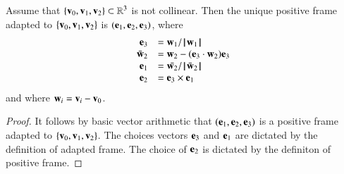 \begin{lemma}[orthonormalization]
\label{lemma:frame}
  Assume that $\{\v_0,\v_1,\v_2\}\subset\ring{R}^3$ is not collinear.
  Then the unique positive frame adapted to 
  $\{\v_0,\v_1,\v_2\}$ is $(\e_1,\e_2,\e_3)$, where
\begin{displaymath}
\begin{array}{rll}
\e_3 &= \w_1/\normo{\w_1}\\
\bar{\w}_2 &= \w_2 - (\e_3\cdot \w_2) \e_3\\
\e_1 &= \bar{\w_2}/\normo{\bar{\w}_2}\\
\e_2 &= \e_3 \times \e_1 \\
\end{array}
\end{displaymath}
and where $\w_i = \v_i - \v_0$.
\end{lemma}

\begin{proof} It follows by basic vector arithmetic that
  $(\e_1,\e_2,\e_3)$ is a positive frame adapted to
  $\{\v_0,\v_1,\v_2\}$.  The choices vectors $\e_3$ and $\e_1$ are
  dictated by the definition of adapted frame.  The choice of $\e_2$
  is dictated by the definiton of positive frame.
\end{proof}

